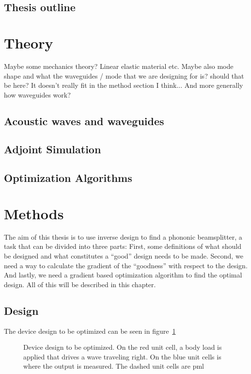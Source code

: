 \documentclass[11pt]{article}
\begin{document}
\subsection{Thesis outline}

\section{Theory}

Maybe some mechanics theory? Linear elastic material etc.
Maybe also mode shape and what the waveguides / mode that we are designing for
is? should that be here? It doesn't really fit in the method section I think...
And more generally how waveguides work?

\subsection{Acoustic waves and waveguides}

\subsection{Adjoint Simulation}

\subsection{Optimization Algorithms}

\section{Methods}

The aim of this thesis is to use inverse design to find a phononic beamsplitter,
a task that can be divided into three parts: First, some definitions of what
should be designed and what constitutes a ``good'' design needs to be made.
Second, we need a way to calculate the gradient of the ``goodness'' with respect
to the design.
And lastly, we need a gradient based optimization algorithm to find the optimal
design.
All of this will be described in this chapter.

\subsection{Design}

The device design to be optimized can be seen in figure~\ref{fig:bs-design}

\begin{figure}[htpb]
	\centering
	
	\caption{
		Device design to be optimized.
		On the red unit cell, a body load is
		applied that drives a wave traveling right.
		On the blue unit cells is where the output is measured.
		The dashed unit cells are \gls{pml}
	}
	\label{fig:bs-design}
\end{figure}
\end{document}
